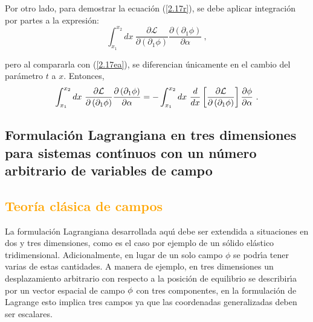 \begin{solution}
\noindent
Por otro lado, para demostrar la ecuaci\'{o}n (\ref{2.17r}), se debe aplicar integraci\'{o}n por partes a la expresi\'{o}n: 
\begin{equation*}
\int_{x_{1}}^{x_{2}}dx\ \frac{\partial \mathcal{L}}{\partial \left( \partial
_{1}\phi \right) }\frac{\partial \left( \partial _{1}\phi \right) }{\partial
\alpha }~,
\end{equation*}

\noindent
pero al compararla con (\ref{2.17ea}), se diferencian \'{u}nicamente en el
cambio del par\'{a}metro $t$ a $x$. Entonces, 
\begin{equation}
\int_{x_{1}}^{x_{2}}dx\ \frac{\partial \mathcal{L}}{\partial \left( \partial
_{1}\phi \right) }\frac{\partial \left( \partial _{1}\phi \right) }{\partial
\alpha }=-\int_{x_{1}}^{x_{2}}dx\ \frac{d}{dx}\left[ \frac{\partial \mathcal{%
L}}{\partial \left( \partial _{1}\phi \right) }\right] \frac{\partial \phi }{%
\partial \alpha }~.  \label{2.17ed}
\end{equation}
\end{solution}

\subsection{Formulaci\'{o}n Lagrangiana en tres dimensiones para sistemas cont\'{\i}nuos con un n\'{u}mero arbitrario de variables de campo}
\vspace{0.2cm}
\subsection*{\textcolor{orange}{Teoría clásica de campos}}
\vspace{0.3cm}
La formulaci\'{o}n Lagrangiana desarrollada aqu\'{\i} debe ser extendida a situaciones en dos y tres dimensiones, como es el caso por ejemplo de un s\'{o}lido  el\'{a}stico tridimensional. Adicionalmente, en lugar de un solo campo $\phi$ se podr\'{\i}a tener varias de estas cantidades. A manera de ejemplo, en tres dimensiones un desplazamiento arbitrario con respecto a la posici\'{o}n de equilibrio se describir\'{\i}a por un vector espacial de campo $\vb{\phi}$ con tres componentes, en la formulaci\'{o}n de Lagrange esto implica tres campos ya que las coordenadas generalizadas deben ser escalares.\\

